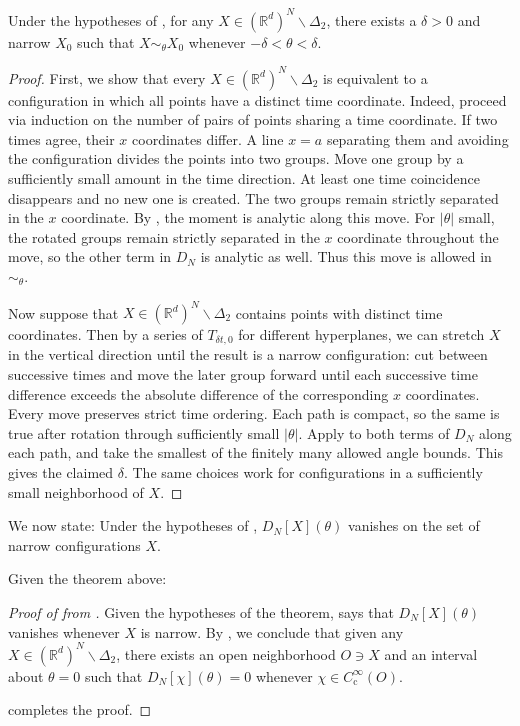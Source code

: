 \documentclass[11pt, letterpaper, reqno]{amsart}
\theoremstyle{definition}
\newenvironment{proposition}
{\pushQED{\qed}\renewcommand{\qedsymbol}{$\blacksquare$}\propositionx}
{\popQED\endpropositionx}
\newenvironment{theorem}
{\pushQED{\qed}\renewcommand{\qedsymbol}{$\blacksquare\square$}\theoremxx}
{\popQED\endtheoremxx}
\theoremstyle{remark}
\newcommand{\bbR}{\mathbb{R}}
\begin{document}
\begin{proposition}\label{prop:narrowing}
    Under the hypotheses of , for any $X\in (\bbR^d)^N\backslash \Delta_2$, there exists a $\delta>0$ and narrow $X_0$ such that $X\sim_\theta X_0$ whenever $-\delta<\theta<\delta$. 
\end{proposition}
\begin{proof}
    First, we show that every $X\in (\bbR^d)^N\backslash \Delta_2$ is equivalent to a configuration in which all points have a distinct time coordinate. Indeed, proceed via induction on the number of pairs of points sharing a time coordinate. If two times agree, their $x$ coordinates differ. A line $x=a$ separating them and avoiding the configuration divides the points into two groups. Move one group by a sufficiently small amount in the time direction. At least one time coincidence disappears and no new one is created. The two groups remain strictly separated in the $x$ coordinate. By , the moment is analytic along this move. For $|\theta|$ small, the rotated groups remain strictly separated in the $x$ coordinate throughout the move, so the other term in $D_N$ is analytic as well. Thus this move is allowed in $\sim_\theta$.

    Now suppose that $X\in (\bbR^d)^N\backslash \Delta_2$ contains points with distinct time coordinates. Then by a series of $T_{\delta t,0}$ for different hyperplanes, we can stretch $X$ in the vertical direction until the result is a narrow configuration: cut between successive times and move the later group forward until each successive time difference exceeds the absolute difference of the corresponding $x$ coordinates. Every move preserves strict time ordering. Each path is compact, so the same is true after rotation through sufficiently small $|\theta|$. Apply  to both terms of $D_N$ along each path, and take the smallest of the finitely many allowed angle bounds. This gives the claimed $\delta$. The same choices work for configurations in a sufficiently small neighborhood of $X$.
\end{proof}

We now state:
\begin{theorem}\label{thm:weaker}
    Under the hypotheses of , $D_N[X](\theta)$ vanishes on the set of narrow configurations $X$.
\end{theorem}

Given the theorem above:
\begin{proof}[Proof of  from ]
    Given the hypotheses of the theorem,  says that $D_N[X](\theta)$ vanishes whenever $X$ is narrow. By , we conclude that given any $X\in (\bbR^d)^N\backslash \Delta_2$, there exists an open neighborhood $O\ni X$ and an interval about $\theta=0$ such that $D_N[\chi](\theta)=0$ whenever $\chi\in C_{\mathrm{c}}^\infty(O)$. 

     completes the proof.   
\end{proof}
\end{document}
